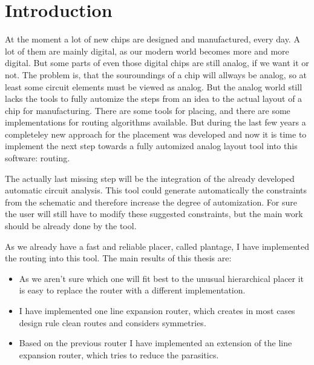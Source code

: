 \chapter{Introduction}

At the moment a lot of new chips are designed and manufactured, every day. A lot of them are mainly digital, as our modern world becomes more and more digital. But some parts of even those digital chips are still analog, if we want it or not. The problem is, that the souroundings of a chip will allways be analog, so at least some circuit elements must be viewed as analog. But the analog world still lacks the tools to fully automize the steps from an idea to the actual layout of a chip for manufacturing. There are some tools for placing, and there are some implementations for routing algorithms available. But during the last few years a completeley new approach for the placement was developed and now it is time to implement the next step towards a fully automized analog layout tool into this software: routing.

The actually last missing step will be the integration of the already developed automatic circuit analysis. This tool could generate automatically the constraints from the schematic and therefore increase the degree of automization. For sure the user will still have to modify these suggested constraints, but the main work should be already done by the tool.

As we already have a fast and reliable placer, called plantage, I have implemented the routing into this tool. The main results of this thesis are:
\begin{itemize}
\item As we aren't sure which one will fit best to the unusual hierarchical placer it is easy to replace the router with a different implementation.
\item I have implemented one line expansion router, which creates in most cases design rule clean routes and considers symmetries.
\item Based on the previous router I have implemented an extension of the line expansion router, which tries to reduce the parasitics.
\end{itemize}